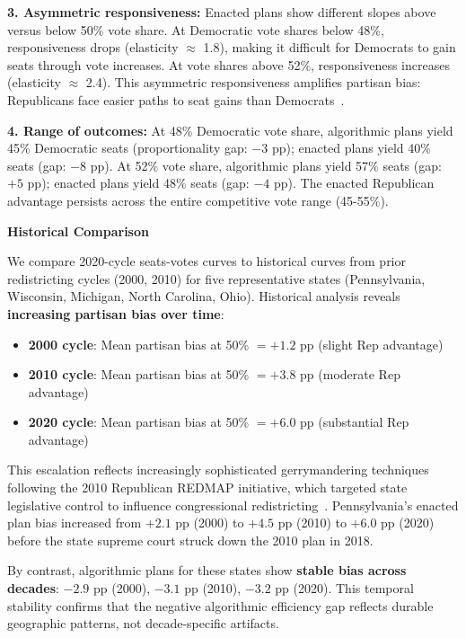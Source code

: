 \textbf{3. Asymmetric responsiveness:} Enacted plans show different slopes above versus below 50\% vote share. At Democratic vote shares below 48\%, responsiveness drops (elasticity $\approx$ 1.8), making it difficult for Democrats to gain seats through vote increases. At vote shares above 52\%, responsiveness increases (elasticity $\approx$ 2.4). This asymmetric responsiveness amplifies partisan bias: Republicans face easier paths to seat gains than Democrats~\cite{mcdonald2006comparative}.

\textbf{4. Range of outcomes:} At 48\% Democratic vote share, algorithmic plans yield 45\% Democratic seats (proportionality gap: $-3$ pp); enacted plans yield 40\% seats (gap: $-8$ pp). At 52\% vote share, algorithmic plans yield 57\% seats (gap: $+5$ pp); enacted plans yield 48\% seats (gap: $-4$ pp). The enacted Republican advantage persists across the entire competitive vote range (45-55\%).

\textbf{Historical Comparison}

We compare 2020-cycle seats-votes curves to historical curves from prior redistricting cycles (2000, 2010) for five representative states (Pennsylvania, Wisconsin, Michigan, North Carolina, Ohio). Historical analysis reveals \textbf{increasing partisan bias over time}:

\begin{itemize}
    \item \textbf{2000 cycle}: Mean partisan bias at 50\% $= +1.2$ pp (slight Rep advantage)
    \item \textbf{2010 cycle}: Mean partisan bias at 50\% $= +3.8$ pp (moderate Rep advantage)
    \item \textbf{2020 cycle}: Mean partisan bias at 50\% $= +6.0$ pp (substantial Rep advantage)
\end{itemize}

This escalation reflects increasingly sophisticated gerrymandering techniques following the 2010 Republican REDMAP initiative, which targeted state legislative control to influence congressional redistricting~\cite{daley2016ratfucked}. Pennsylvania's enacted plan bias increased from $+2.1$ pp (2000) to $+4.5$ pp (2010) to $+6.0$ pp (2020) before the state supreme court struck down the 2010 plan in 2018.

By contrast, algorithmic plans for these states show \textbf{stable bias across decades}: $-2.9$ pp (2000), $-3.1$ pp (2010), $-3.2$ pp (2020). This temporal stability confirms that the negative algorithmic efficiency gap reflects durable geographic patterns, not decade-specific artifacts.

